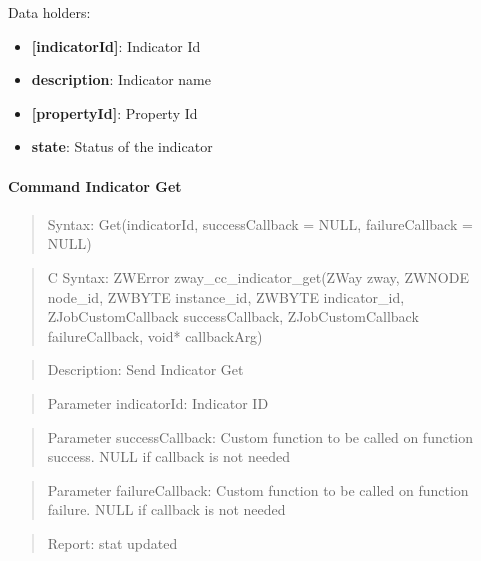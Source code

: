 \noindent
Data holders:

\begin{itemize}
\item \textbf{[indicatorId]}: Indicator Id
\item \qquad\textbf{description}: Indicator name
\item \qquad\textbf{[propertyId]}: Property Id
\item \qquad\qquad\textbf{state}: Status of the indicator
\end{itemize}

\paragraph{Command Indicator Get}
\begin{quote}Syntax: Get(indicatorId, successCallback = NULL, failureCallback = NULL)\end{quote}
\begin{quote}C Syntax: ZWError zway\_cc\_indicator\_get(ZWay zway, ZWNODE node\_id, ZWBYTE instance\_id, ZWBYTE indicator\_id, ZJobCustomCallback successCallback, ZJobCustomCallback failureCallback, void* callbackArg)\end{quote}
\begin{quote}Description: Send Indicator Get\end{quote}
\begin{quote}Parameter indicatorId: Indicator ID\end{quote}
\begin{quote}Parameter successCallback: Custom function to be called on function success. NULL if callback is not needed\end{quote}
\begin{quote}Parameter failureCallback: Custom function to be called on function failure. NULL if callback is not needed\end{quote}
\begin{quote}Report: stat updated\end{quote}

